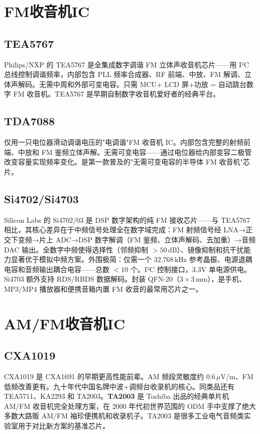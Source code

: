 \documentclass[12pt,UTF8]{ctexbook}
\begin{document}
\section{FM收音机IC}
\label{sec:fm_radio_ic}

\subsection{TEA5767}

Philips/NXP 的 TEA5767 是全集成数字调谐 FM 立体声收音机芯片——用 I²C 总线控制调谐频率，内部包含 PLL 频率合成器、RF 前端、中放、FM 解调、立体声解码。无需中周和外部可变电容。只需 MCU+ LCD 屏+功放 = 自动跳台数字 FM 收音机。TEA5767 是早期自制数字收音机爱好者的经典平台。

\subsection{TDA7088}

仅用一只电位器滑动调谐电压的"电调谐"FM 收音机 IC。内部包含完整的射频前端、中放和 FM 鉴频立体声解。无需可变电容——通过电位器给内部变容二极管改变容量实现频率变化。是第一款普及的"无需可变电容的半导体 FM 收音机"芯片。

\subsection{Si4702/Si4703}

Silicon Labs 的 Si4702/03 是 DSP 数字架构的纯 FM 接收芯片——与 TEA5767 相比，其核心差异在于中频信号处理全在数字域完成：FM 射频信号经 LNA→正交下变频→片上 ADC→DSP 数字解调（FM 鉴频、立体声解码、去加重）→音频 DAC 输出。全数字中频使得选择性（邻频抑制 $>50\,\mathrm{dB}$）、镜像抑制和抗干扰能力显著优于模拟中频方案。外围极简：仅需一个 $32.768\,\mathrm{kHz}$ 参考晶振、电源退耦电容和音频输出耦合电容——总数 $<10$ 个。I²C 控制接口，3.3V 单电源供电。Si4703 额外支持 RDS/RBDS 数据解码。封装 QFN-20（$3\times3\,\mathrm{mm}$），是手机、MP3/MP4 播放器和便携音箱内置 FM 收音的最常用芯片之一。

\section{AM/FM收音机IC}
\label{sec:am_fm_radio_ic}

\subsection{CXA1019}

CXA1019 是 CXA1691 的早期更高性能前辈。AM 频段灵敏度约 $0.6\,\mu\mathrm{V/m}$、FM 低频改善更有。九十年代中国名牌中波+调频台收录机的核心。同类品还有 TEA5711、KA2293 和 TA2003。\textbf{TA2003} 是 Toshiba 出品的经典单片机 AM/FM 收音机完全处理方案，在 2000 年代初世界范围的 ODM 手中支撑了绝大多数大路贩 AM/FM 袖珍便携机和收录机子。TA2003 是很多工业电气音频类实验室用于对比新方案的基准芯片。
\end{document}
